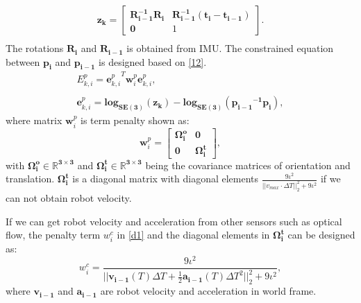 \documentclass[journal]{IEEEtran}
\begin{document}
\begin{equation}\label{30}
\begin{array}{c}
\mathbf {z_{k}} 
= \left[\begin{array}{cc}
    \mathbf{R_{i-1}^{-1} R_{i}}  & \mathbf{R_{i-1}^{-1}(t_i-t_{i-1})} \\
    \mathbf{0}  &  1 
    \end{array}\right].\\
\end{array}
\end{equation}
The rotations $\mathbf{R_i}$ and $\mathbf{R_{i-1}}$ is obtained from IMU. 
The constrained equation between  $\mathbf{p_i}$ and $\mathbf{p_{i-1}}$ is designed based on \eqref{12}.
\begin{equation}\label{31}
\begin{array}{ll}
{E_{k,i}^{p}} = {\mathbf{e}_{k,i}^{p}}^{T} \mathbf {w}_i^{p}\mathbf{e}_{k,i}^{p},\\
\\\mathbf{e}_{k,i}^{p} = \mathbf{ log_{SE(3)}({z}_{k}) - log_{SE(3)}(\mathbf{p_{i-1}}^{-1} \mathbf{p_{i}}) },
\end{array}
\end{equation}
where matrix $\mathbf w_i^{p}$ is term penalty shown as:
\begin{equation}\label{d2}
\mathbf {w}_i^{p} = \left[\begin{array}{cc}
    \mathbf{\Omega^{o}_{i}}  & \mathbf{0} \\
    \mathbf{0}  &  \mathbf{\Omega_{i}^{t}} 
    \end{array}\right],
\end{equation}
with $\mathbf{\Omega^{o}_{i} \in \mathbb{R}^{3 \times 3}}$ and $\mathbf{\Omega_{i}^{t} \in \mathbb{R}^{3 \times 3}}$ being the covariance matrices of orientation and translation. $\mathbf{\Omega_{i}^{t}}$ is a diagonal matrix with diagonal elements $\frac{9\iota^{2}}{||v_{max} \cdot \Delta T||_2^{2} + 9\iota^{2}}$ if we can not obtain robot velocity. 

If we can get  robot velocity and acceleration from other sensors such as optical flow, the penalty term $w_i^{c}$ in \eqref{d1} and the diagonal elements in $\mathbf{\Omega_{i}^{t}}$ can be designed as:
\begin{equation}\label{fa1}
w_i^{c} = \frac{9\iota^{2}}{||\mathbf{v_{i-1}}(T)\Delta T + \frac{1}{2}\mathbf{a_{i-1}}(T)\Delta T^{2}||_2^{2} + 9\iota^{2}},
\end{equation}
where $\mathbf{v_{i-1}}$ and $\mathbf{a_{i-1}}$ are robot velocity and acceleration in world frame.
\end{document}
